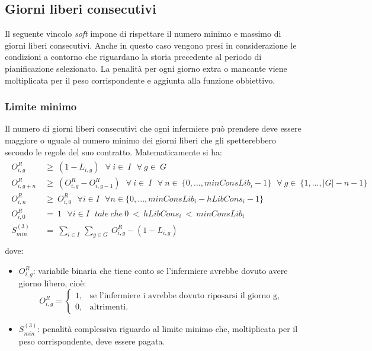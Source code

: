 \subsection{Giorni liberi consecutivi}
Il seguente vincolo \textit{soft} impone di rispettare il numero minimo e massimo di giorni liberi consecutivi. Anche in questo caso vengono presi in considerazione le condizioni a contorno che riguardano la storia precedente al periodo di pianificazione selezionato. La penalità per ogni giorno extra o mancante viene moltiplicata per il peso corrispondente e aggiunta alla funzione obbiettivo.

\subsubsection{Limite minimo}
Il numero di giorni liberi consecutivi che ogni infermiere può prendere deve essere maggiore o uguale al numero minimo dei giorni liberi che gli spetterebbero secondo le regole del suo contratto.
Matematicamente si ha:
\begin{gather}
\begin{aligned}
O_{i,g}^R ~ &\geq ~ (1 - L_{i,g}) ~~~ \forall ~ i \in ~ I ~~~ \forall ~ g \in ~ G \\
O_{i,g+n}^R ~ &\geq ~ (O_{i,g}^R - O_{i,g-1}^R) ~~~ \forall ~ i \in ~ I ~~~ \forall ~ n \in ~ \{0,...,minConsLib_i - 1\} ~~~ \forall ~ g \in ~ \{1,...,|G| - n - 1\} \\
O_{i,n}^R ~ &\geq ~ O_{i,0}^R ~~~ \forall i \in I ~~~ \forall n \in \{0,...,minConsLib_i - hLibCons_i - 1\} \\
O_{i,0}^R ~ &= ~ 1 ~~~ \forall i \in I ~~~ tale ~ che ~ 0 ~<~ hLibCons_i ~<~ minConsLib_i \\
S^{(3)}_{min} ~ &= ~ \sum_{i \in I}  ~ \sum_{g \in G} ~ O_{i,g}^R - (1 - L_{i,g}) \\
\end{aligned}
\end{gather}
dove:
\begin{itemize}
\item $O_{i,g}^R$: variabile binaria che tiene conto se l'infermiere avrebbe dovuto avere giorno libero, cioè:
\begin{equation}
\label{eq:varStarbbeACasa}
O_{i,g}^R=
\begin{cases}
1, & \text{se l'infermiere i avrebbe dovuto riposarsi il giorno g,} \\
0, & \text{altrimenti.}
\end{cases}
\end{equation}
\item $S^{(3)}_{min}$: penalità complessiva riguardo al limite minimo che, moltiplicata per il peso corrispondente, deve essere pagata.
\end{itemize}

